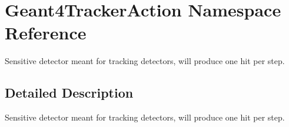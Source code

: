 \hypertarget{namespace_geant4_tracker_action}{}\section{Geant4\+Tracker\+Action Namespace Reference}
\label{namespace_geant4_tracker_action}


Sensitive detector meant for tracking detectors, will produce one hit per step.  




\subsection{Detailed Description}
Sensitive detector meant for tracking detectors, will produce one hit per step. 